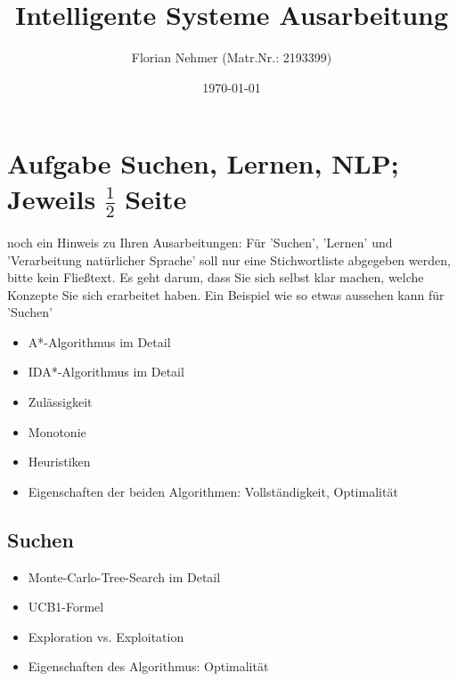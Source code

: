 \documentclass[a4paper, 11pt]{scrartcl}
\title{Intelligente Systeme Ausarbeitung}
\author{Florian Nehmer (Matr.Nr.: 2193399)}
\date{\today}
\begin{document}
\maketitle

\newpage
\tableofcontents

\newpage


\section{Aufgabe Suchen, Lernen, NLP; Jeweils $\frac{1}{2}$ Seite}
noch ein Hinweis zu Ihren Ausarbeitungen: Für 'Suchen', 'Lernen' und 'Verarbeitung natürlicher Sprache' soll nur eine Stichwortliste
abgegeben werden, bitte kein Fließtext. Es geht darum, dass Sie sich selbst klar machen, welche Konzepte Sie sich erarbeitet haben.
Ein Beispiel wie so etwas aussehen kann für 'Suchen'

\begin{itemize}
\item A*-Algorithmus im Detail
\item IDA*-Algorithmus im Detail
\item Zulässigkeit
\item Monotonie
\item Heuristiken
\item Eigenschaften der beiden Algorithmen: Vollständigkeit, Optimalität
\end{itemize}

\subsection{Suchen}
\begin{itemize}
  \item Monte-Carlo-Tree-Search im Detail
  \item UCB1-Formel
  \item Exploration vs. Exploitation
  \item Eigenschaften des Algorithmus: Optimalität
\end{itemize}
\end{document}

